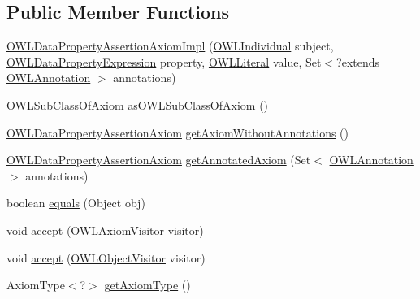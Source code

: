 \subsection*{Public Member Functions}
\begin{DoxyCompactItemize}
\item 
\hyperlink{classuk_1_1ac_1_1manchester_1_1cs_1_1owl_1_1owlapi_1_1_o_w_l_data_property_assertion_axiom_impl_aaf6eb699c3ffc2596b26b0a79796b9e1}{O\-W\-L\-Data\-Property\-Assertion\-Axiom\-Impl} (\hyperlink{interfaceorg_1_1semanticweb_1_1owlapi_1_1model_1_1_o_w_l_individual}{O\-W\-L\-Individual} subject, \hyperlink{interfaceorg_1_1semanticweb_1_1owlapi_1_1model_1_1_o_w_l_data_property_expression}{O\-W\-L\-Data\-Property\-Expression} property, \hyperlink{interfaceorg_1_1semanticweb_1_1owlapi_1_1model_1_1_o_w_l_literal}{O\-W\-L\-Literal} value, Set$<$?extends \hyperlink{interfaceorg_1_1semanticweb_1_1owlapi_1_1model_1_1_o_w_l_annotation}{O\-W\-L\-Annotation} $>$ annotations)
\item 
\hyperlink{interfaceorg_1_1semanticweb_1_1owlapi_1_1model_1_1_o_w_l_sub_class_of_axiom}{O\-W\-L\-Sub\-Class\-Of\-Axiom} \hyperlink{classuk_1_1ac_1_1manchester_1_1cs_1_1owl_1_1owlapi_1_1_o_w_l_data_property_assertion_axiom_impl_ad6f06f91826c91094c453fc25a28a39f}{as\-O\-W\-L\-Sub\-Class\-Of\-Axiom} ()
\item 
\hyperlink{interfaceorg_1_1semanticweb_1_1owlapi_1_1model_1_1_o_w_l_data_property_assertion_axiom}{O\-W\-L\-Data\-Property\-Assertion\-Axiom} \hyperlink{classuk_1_1ac_1_1manchester_1_1cs_1_1owl_1_1owlapi_1_1_o_w_l_data_property_assertion_axiom_impl_a94274afc845bde87ec136f9369c08b7d}{get\-Axiom\-Without\-Annotations} ()
\item 
\hyperlink{interfaceorg_1_1semanticweb_1_1owlapi_1_1model_1_1_o_w_l_data_property_assertion_axiom}{O\-W\-L\-Data\-Property\-Assertion\-Axiom} \hyperlink{classuk_1_1ac_1_1manchester_1_1cs_1_1owl_1_1owlapi_1_1_o_w_l_data_property_assertion_axiom_impl_ad26c2ccb65bc4a496f0cd568cd543954}{get\-Annotated\-Axiom} (Set$<$ \hyperlink{interfaceorg_1_1semanticweb_1_1owlapi_1_1model_1_1_o_w_l_annotation}{O\-W\-L\-Annotation} $>$ annotations)
\item 
boolean \hyperlink{classuk_1_1ac_1_1manchester_1_1cs_1_1owl_1_1owlapi_1_1_o_w_l_data_property_assertion_axiom_impl_a943c3366dd0674ecf89074b34b15e7c5}{equals} (Object obj)
\item 
void \hyperlink{classuk_1_1ac_1_1manchester_1_1cs_1_1owl_1_1owlapi_1_1_o_w_l_data_property_assertion_axiom_impl_a1f794ffcaca224f5467ded8c9f6d7e58}{accept} (\hyperlink{interfaceorg_1_1semanticweb_1_1owlapi_1_1model_1_1_o_w_l_axiom_visitor}{O\-W\-L\-Axiom\-Visitor} visitor)
\item 
void \hyperlink{classuk_1_1ac_1_1manchester_1_1cs_1_1owl_1_1owlapi_1_1_o_w_l_data_property_assertion_axiom_impl_a9e98e5e08faf46b2ca327773b834f4d1}{accept} (\hyperlink{interfaceorg_1_1semanticweb_1_1owlapi_1_1model_1_1_o_w_l_object_visitor}{O\-W\-L\-Object\-Visitor} visitor)
\item 
Axiom\-Type$<$?$>$ \hyperlink{classuk_1_1ac_1_1manchester_1_1cs_1_1owl_1_1owlapi_1_1_o_w_l_data_property_assertion_axiom_impl_a42759f6ace85ce823f072fb10b54e8a8}{get\-Axiom\-Type} ()
\end{DoxyCompactItemize}
